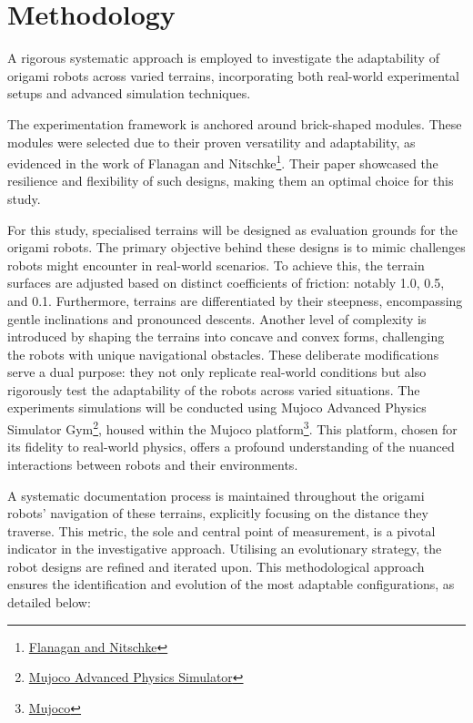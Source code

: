 \documentclass{sigchi}
\begin{document}
\section{Methodology}
A rigorous systematic approach is employed to investigate the adaptability of origami robots across varied terrains, incorporating both real-world experimental setups and advanced simulation techniques. 

The experimentation framework is anchored around brick-shaped modules. These modules were selected due to their proven versatility and adaptability, as evidenced in the work of Flanagan and Nitschke\cite{flanagan_evolving_2023}\footnote{\href{https://github.com/Rhett-Flanagan/revolve2-folding/tree/triangle-folding}{Flanagan and Nitschke}}. Their paper showcased the resilience and flexibility of such designs, making them an optimal choice for this study.

For this study, specialised terrains will be designed as evaluation grounds for the origami robots. The primary objective behind these designs is to mimic challenges robots might encounter in real-world scenarios. To achieve this, the terrain surfaces are adjusted based on distinct coefficients of friction: notably 1.0, 0.5, and 0.1. Furthermore, terrains are differentiated by their steepness, encompassing gentle inclinations and pronounced descents. Another level of complexity is introduced by shaping the terrains into concave and convex forms, challenging the robots with unique navigational obstacles. These deliberate modifications serve a dual purpose: they not only replicate real-world conditions but also rigorously test the adaptability of the robots across varied situations. The experiments simulations will be conducted using Mujoco Advanced Physics Simulator Gym\cite{todorov2012mujoco}\footnote{\href{https://github.com/google-deepmind/mujoco}{Mujoco Advanced Physics Simulator}}, housed within the Mujoco platform\footnote{\href{https://mujoco.org/}{Mujoco}}. This platform, chosen for its fidelity to real-world physics, offers a profound understanding of the nuanced interactions between robots and their environments.

A systematic documentation process is maintained throughout the origami robots' navigation of these terrains, explicitly focusing on the distance they traverse. This metric, the sole and central point of measurement, is a pivotal indicator in the investigative approach. Utilising an evolutionary strategy, the robot designs are refined and iterated upon. This methodological approach ensures the identification and evolution of the most adaptable configurations, as detailed below:
\end{document}

